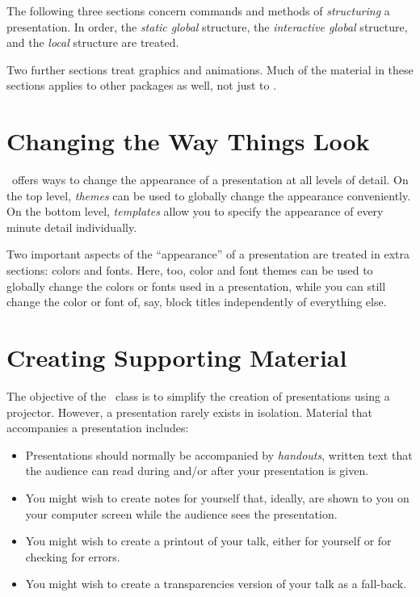 \documentclass[doc2]{ltxdoc}
\begin{document}
The following three sections concern commands and methods of \emph{structuring} a presentation. In order, the \emph{static global} structure, the \emph{interactive global} structure, and the \emph{local} structure are treated.

Two further sections treat graphics and animations. Much of the material in these sections applies to other packages as well, not just to \beamer.











\part{Changing the Way Things Look}

\beamer\ offers ways to change the appearance of a presentation at all levels of detail. On the top level, \emph{themes} can be used to globally change the appearance conveniently. On the bottom level, \emph{templates} allow you to specify the appearance of every minute detail individually.

Two important aspects of the ``appearance'' of a presentation are treated in extra sections: colors and fonts. Here, too, color and font themes can be used to globally change the colors or fonts used in a presentation, while you can still change the color or font of, say, block titles independently of everything else.








\part{Creating Supporting Material}

The objective of the \beamer\ class is to simplify the creation of presentations using a projector. However, a presentation rarely exists in isolation. Material that accompanies a presentation includes:
\begin{itemize}
\item
  Presentations should normally be accompanied by \emph{handouts}, written text that the audience can read during and/or after your presentation is given.
\item
  You might wish to create notes for yourself that, ideally, are shown to you on your computer screen while the audience sees the presentation.
\item
  You might wish to create a printout of your talk, either for yourself or for checking for errors.
\item
  You might wish to create a transparencies version of your talk as a fall-back.
\end{itemize}
\end{document}
